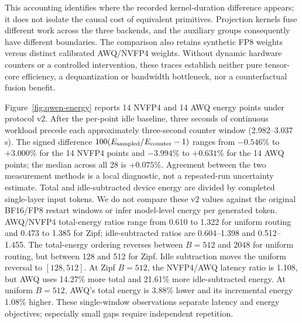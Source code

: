 \documentclass[10pt,twocolumn]{article}
\begin{document}
This accounting identifies where the recorded kernel-duration difference
appears; it does not isolate the causal cost of equivalent primitives.
Projection kernels fuse different work across the three backends, and the
auxiliary groups consequently have different boundaries. The comparison
also retains synthetic FP8 weights versus distinct calibrated AWQ/NVFP4
weights. Without dynamic hardware counters or a controlled intervention,
these traces establish neither pure tensor-core efficiency, a
dequantization or bandwidth bottleneck, nor a counterfactual fusion benefit.

Figure~\ref{fig:qwen-energy} reports 14 NVFP4 and 14 AWQ energy points
under protocol v2.
After the per-point idle baseline, three seconds of continuous workload
precede each approximately three-second counter window (2.982--3.037 s).
The signed difference $100(E_{\rm sampled}/E_{\rm counter}-1)$ ranges
from $-0.546\%$ to $+3.000\%$ for the 14 NVFP4 points and
$-3.994\%$ to $+0.631\%$ for the 14 AWQ points; the median across all
28 is $+0.075\%$.
Agreement between the two measurement methods is a local diagnostic, not a repeated-run
uncertainty estimate. Total and idle-subtracted device energy are divided
by completed single-layer input tokens. We do not compare these v2 values
against the original BF16/FP8 restart windows or infer model-level energy
per generated token. AWQ/NVFP4 total-energy ratios range from 0.610 to
1.322 for uniform routing and 0.473 to 1.385 for Zipf; idle-subtracted
ratios are 0.604--1.398 and 0.512--1.455. The total-energy ordering reverses
between $B=512$ and 2048 for uniform routing, but between 128 and 512 for
Zipf. Idle subtraction moves the uniform reversal to $[128,512]$.
At Zipf $B=512$, the NVFP4/AWQ latency ratio is 1.108, but AWQ uses
14.27\% more total and 21.61\% more idle-subtracted energy. At uniform
$B=512$, AWQ's total energy is 3.88\% lower and its incremental energy
1.08\% higher. These single-window observations separate latency and
energy objectives; especially small gaps require independent repetition.
\end{document}
